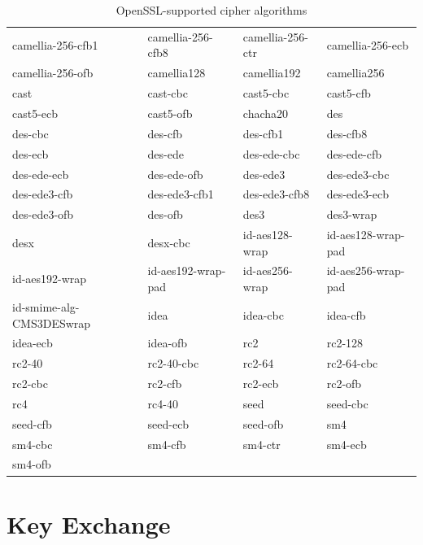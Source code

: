 \documentclass[a4paper, 12pt]{book} %
\begin{document}
\begin{table}[H]
\begin{tabular}{llll}
camellia-256-cfb1 & camellia-256-cfb8 & camellia-256-ctr & camellia-256-ecb \\
camellia-256-ofb & camellia128 & camellia192 & camellia256 \\
cast & cast-cbc & cast5-cbc & cast5-cfb \\
cast5-ecb & cast5-ofb & chacha20 & des \\
des-cbc & des-cfb & des-cfb1 & des-cfb8 \\
des-ecb & des-ede & des-ede-cbc & des-ede-cfb \\
des-ede-ecb & des-ede-ofb & des-ede3 & des-ede3-cbc \\
des-ede3-cfb & des-ede3-cfb1 & des-ede3-cfb8 & des-ede3-ecb \\
des-ede3-ofb & des-ofb & des3 & des3-wrap \\
desx & desx-cbc & id-aes128-wrap & id-aes128-wrap-pad \\
id-aes192-wrap & id-aes192-wrap-pad & id-aes256-wrap & id-aes256-wrap-pad \\
id-smime-alg-CMS3DESwrap & idea & idea-cbc & idea-cfb \\
idea-ecb & idea-ofb & rc2 & rc2-128 \\
rc2-40 & rc2-40-cbc & rc2-64 & rc2-64-cbc \\
rc2-cbc & rc2-cfb & rc2-ecb & rc2-ofb \\
rc4 & rc4-40 & seed & seed-cbc \\
seed-cfb & seed-ecb & seed-ofb & sm4 \\
sm4-cbc & sm4-cfb & sm4-ctr & sm4-ecb \\
sm4-ofb & & & \\
\hline
\end{tabular}
\caption{OpenSSL-supported cipher algorithms}
\end{table}



\section{Key Exchange}
\end{document}
